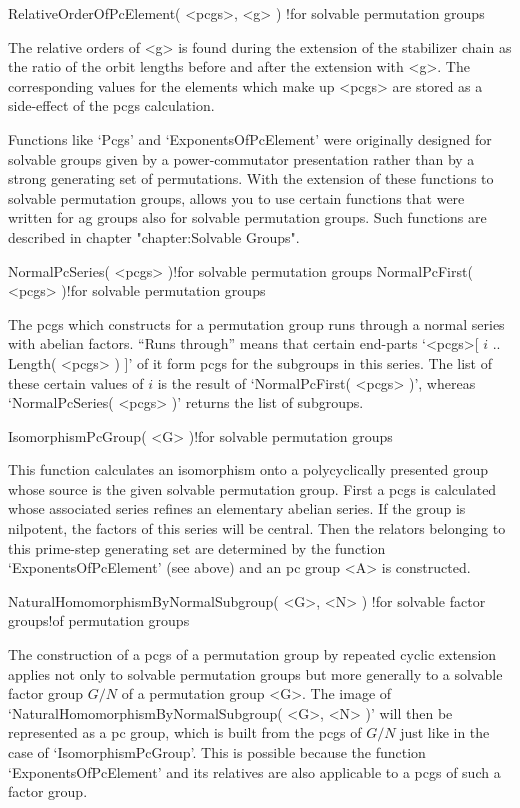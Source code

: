 \>RelativeOrderOfPcElement( <pcgs>, <g> )%
  !{for solvable permutation groups}

The  relative  orders  of  <g>  is  found during   the   extension of the
stabilizer chain as the ratio  of the orbit  lengths before and after the
extension with <g>. The corresponding values  for the elements which make
up <pcgs> are stored as a side-effect of the pcgs calculation.

Functions like `Pcgs' and `ExponentsOfPcElement' were originally designed
for solvable groups given by  a power-commutator presentation rather than
by a strong  generating set of  permutations. With the extension of these
functions to solvable  permutation   groups,  {\GAP} allows you    to use
certain functions  that   were written  for ag  groups  also for solvable
permutation   groups.     Such  functions   are   described    in chapter
"chapter:Solvable Groups".

\>NormalPcSeries( <pcgs> )!{for solvable permutation groups}
\>NormalPcFirst( <pcgs> )!{for solvable permutation groups}

The pcgs  which {\GAP} constructs for  a permutation group runs through a
normal  series with abelian  factors. ``Runs through'' means that certain
end-parts  `<pcgs>[ $i$ ..  Length( <pcgs> ) ]'  of it form  pcgs for the
subgroups in this series. The list of these certain values  of $i$ is the
result of `NormalPcFirst( <pcgs>  )', whereas `NormalPcSeries( <pcgs>  )'
returns the list of subgroups.

\>IsomorphismPcGroup( <G> )!{for solvable permutation groups}

This function calculates an  isomorphism onto a  polycyclically presented
group whose source is the given solvable permutation  group. First a pcgs
is  calculated whose  associated  series  refines an  elementary  abelian
series. If the  group is  nilpotent, the  factors of this  series will be
central. Then  the relators belonging  to this  prime-step generating set
are determined by the function  `ExponentsOfPcElement' (see above) and an
pc group <A> is constructed.

\>NaturalHomomorphismByNormalSubgroup( <G>, <N> )%
  !{for solvable factor groups!of permutation groups}

The construction  of a  pcgs of a  permutation  group by  repeated cyclic
extension   applies  not only to   solvable permutation   groups but more
generally to a solvable factor  group $G/N$ of  a permutation group  <G>.
The image of `NaturalHomomorphismByNormalSubgroup( <G>,  <N> )' will then
be represented as a pc group, which is built  from the pcgs of $G/N$ just
like in the  case of `IsomorphismPcGroup'. This  is  possible because the
function `ExponentsOfPcElement' and  its relatives are also applicable to
a pcgs of such a factor group.

